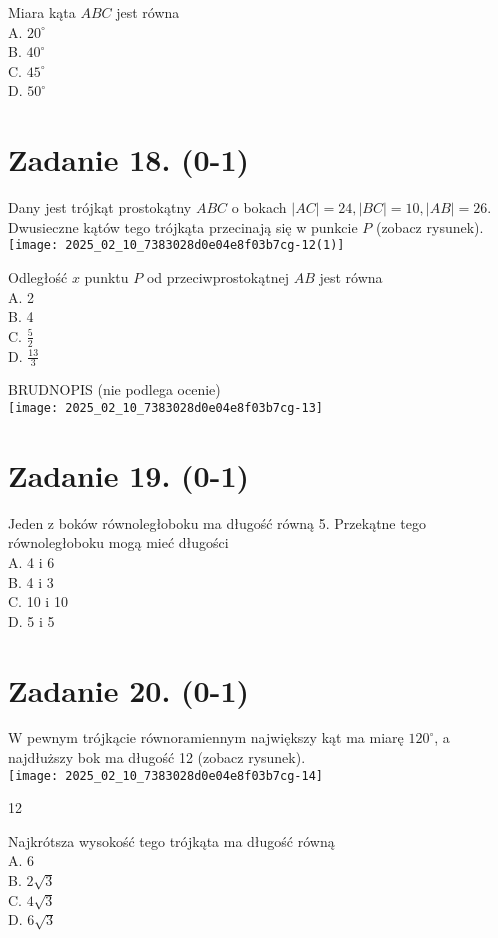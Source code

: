 \documentclass[10pt]{article}
\begin{document}
Miara kąta \(A B C\) jest równa\\
A. \(20^{\circ}\)\\
B. \(40^{\circ}\)\\
C. \(45^{\circ}\)\\
D. \(50^{\circ}\)

\section*{Zadanie 18. (0-1)}
Dany jest trójkąt prostokątny \(A B C\) o bokach \(|A C|=24,|B C|=10,|A B|=26\). Dwusieczne kątów tego trójkąta przecinają się w punkcie \(P\) (zobacz rysunek).\\
\texttt{[image: 2025\_02\_10\_7383028d0e04e8f03b7cg-12(1)]}

Odległość \(x\) punktu \(P\) od przeciwprostokątnej \(A B\) jest równa\\
A. 2\\
B. 4\\
C. \(\frac{5}{2}\)\\
D. \(\frac{13}{3}\)

BRUDNOPIS (nie podlega ocenie)\\
\texttt{[image: 2025\_02\_10\_7383028d0e04e8f03b7cg-13]}

\section*{Zadanie 19. (0-1)}
Jeden z boków równoległoboku ma długość równą 5. Przekątne tego równoległoboku mogą mieć długości\\
A. 4 i 6\\
B. 4 i 3\\
C. 10 i 10\\
D. 5 i 5

\section*{Zadanie 20. (0-1)}
W pewnym trójkącie równoramiennym największy kąt ma miarę \(120^{\circ}\), a najdłuższy bok ma długość 12 (zobacz rysunek).\\
\texttt{[image: 2025\_02\_10\_7383028d0e04e8f03b7cg-14]}

12

Najkrótsza wysokość tego trójkąta ma długość równą\\
A. 6\\
B. \(2 \sqrt{3}\)\\
C. \(4 \sqrt{3}\)\\
D. \(6 \sqrt{3}\)
\end{document}
